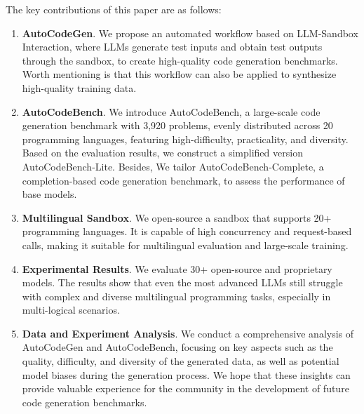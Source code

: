 The key contributions of this paper are as follows:






\begin{enumerate}
    \item \textbf{AutoCodeGen}. We propose an automated workflow based on LLM-Sandbox Interaction, where LLMs generate test inputs and obtain test outputs through the sandbox, to create high-quality code generation benchmarks. Worth mentioning is that this workflow can also be applied to synthesize high-quality training data.
    \item \textbf{AutoCodeBench}. We introduce AutoCodeBench, a large-scale code generation benchmark with 3,920 problems, evenly distributed across 20 programming languages, featuring high-difficulty, practicality, and diversity. Based on the evaluation results, we construct a simplified version AutoCodeBench-Lite. Besides, We tailor AutoCodeBench-Complete, a completion-based code generation benchmark, to assess the performance of base models.
    \item \textbf{Multilingual Sandbox}. We open-source a sandbox that supports 20+ programming languages. It is capable of high concurrency and request-based calls, making it suitable for multilingual evaluation and large-scale training.
    \item \textbf{Experimental Results}. We evaluate 30+ open-source and proprietary models. The results show that even the most advanced LLMs still struggle with complex and diverse multilingual programming tasks, especially in multi-logical scenarios.
    \item \textbf{Data and Experiment Analysis}. We conduct a comprehensive analysis of AutoCodeGen and AutoCodeBench, focusing on key aspects such as the quality, difficulty, and diversity of the generated data, as well as potential model biases during the generation process. We hope that these insights can provide valuable experience for the community in the development of future code generation benchmarks.
\end{enumerate}













